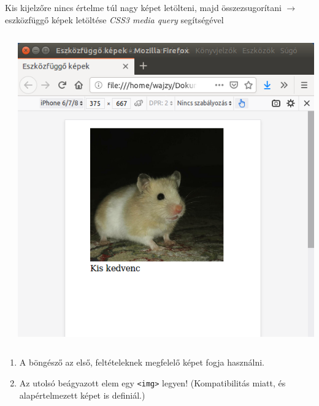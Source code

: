 \begin{frame}
  Kis kijelzőre nincs értelme túl nagy képet letölteni, majd összezsugorítani $\to$ eszközfüggő képek letöltése \emph{CSS3 media query} segítségével
  \begin{columns}
      \begin{exampleblock}{}
        \tiny
        
      \end{exampleblock}
      \centering \includegraphics[scale=.18]{kepmeret.png}
  \end{columns} 
  \begin{enumerate}
    \item A böngésző az első, feltételeknek megfelelő képet fogja használni.
    \item Az utolsó beágyazott elem egy \texttt{<img>} legyen! (Kompatibilitás miatt, és alapértelmezett képet is definiál.)
  \end{enumerate}
\end{frame}

